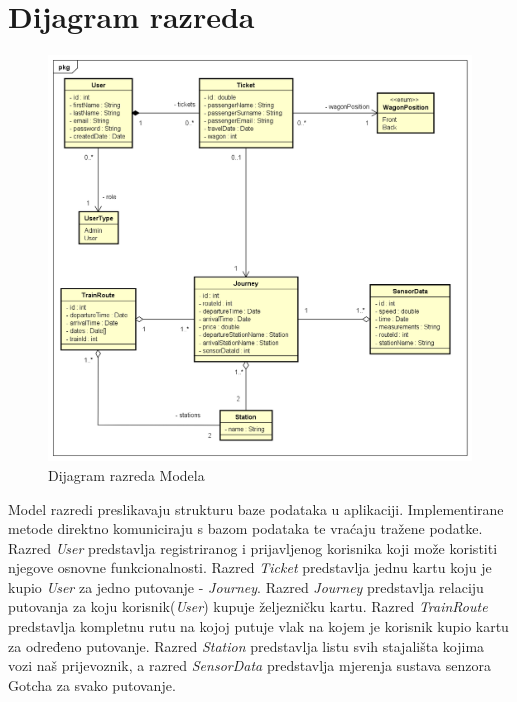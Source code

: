 		\section{Dijagram razreda}
		
	

				\begin{figure}[H]
					\centering
					\includegraphics[width=1\linewidth]{"slike/ModelClassDiagram"}
					\caption{Dijagram razreda Modela}
					\label{fig:dijagram-model}
				\end{figure}

				{Model razredi preslikavaju strukturu baze podataka u aplikaciji. Implementirane metode direktno komuniciraju s bazom podataka te vraćaju tražene podatke. Razred \textit{User} predstavlja registriranog i prijavljenog korisnika koji može koristiti njegove osnovne funkcionalnosti. Razred \textit{Ticket} predstavlja jednu kartu koju je kupio \textit{User} za jedno putovanje - \textit{Journey}. Razred \textit{Journey} predstavlja relaciju putovanja za koju korisnik(\textit{User}) kupuje željezničku kartu. Razred \textit{TrainRoute} predstavlja kompletnu rutu na kojoj putuje vlak na kojem je korisnik kupio kartu za određeno putovanje. Razred \textit{Station} predstavlja listu svih stajališta kojima vozi naš prijevoznik, a razred \textit{SensorData} predstavlja mjerenja sustava senzora Gotcha za svako putovanje.}

